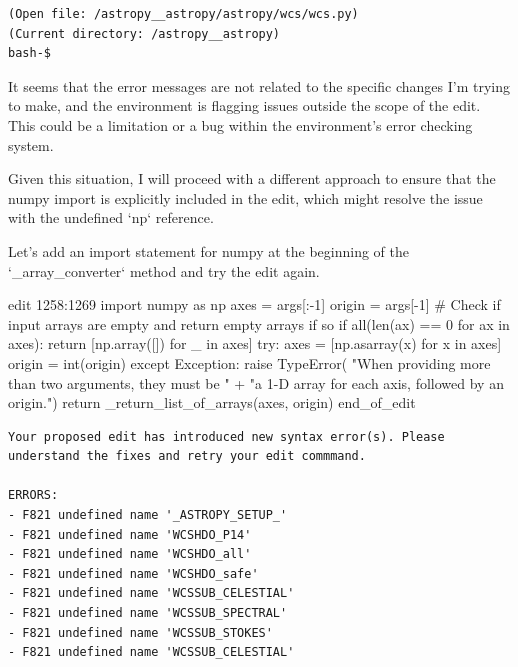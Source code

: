 {\begin{observationbox}
\begin{Verbatim}[breaklines=true, breakanywhere=true]
(Open file: /astropy__astropy/astropy/wcs/wcs.py)
(Current directory: /astropy__astropy)
bash-$
\end{Verbatim}
\end{observationbox}
\begin{agentbox}
It seems that the error messages are not related to the specific changes I'm trying to make, and the environment is flagging issues outside the scope of the edit. This could be a limitation or a bug within the environment's error checking system.



Given this situation, I will proceed with a different approach to ensure that the numpy import is explicitly included in the edit, which might resolve the issue with the undefined `np` reference.



Let's add an import statement for numpy at the beginning of the `\_array\_converter` method and try the edit again.

\hrulefill
\begin{CodeVerbatim}[breaklines=true, breakanywhere=true]
edit 1258:1269
            import numpy as np
            axes = args[:-1]
            origin = args[-1]
            # Check if input arrays are empty and return empty arrays if so
            if all(len(ax) == 0 for ax in axes):
                return [np.array([]) for _ in axes]
            try:
                axes = [np.asarray(x) for x in axes]
                origin = int(origin)
            except Exception:
                raise TypeError(
                    "When providing more than two arguments, they must be " +
                    "a 1-D array for each axis, followed by an origin.")
            return _return_list_of_arrays(axes, origin)
end_of_edit
\end{CodeVerbatim}
\end{agentbox}
\begin{observationbox}\begin{Verbatim}[breaklines=true, breakanywhere=true]
Your proposed edit has introduced new syntax error(s). Please understand the fixes and retry your edit commmand.

ERRORS:
- F821 undefined name '_ASTROPY_SETUP_'
- F821 undefined name 'WCSHDO_P14'
- F821 undefined name 'WCSHDO_all'
- F821 undefined name 'WCSHDO_safe'
- F821 undefined name 'WCSSUB_CELESTIAL'
- F821 undefined name 'WCSSUB_SPECTRAL'
- F821 undefined name 'WCSSUB_STOKES'
- F821 undefined name 'WCSSUB_CELESTIAL'


\end{Verbatim}
\end{observationbox}}
